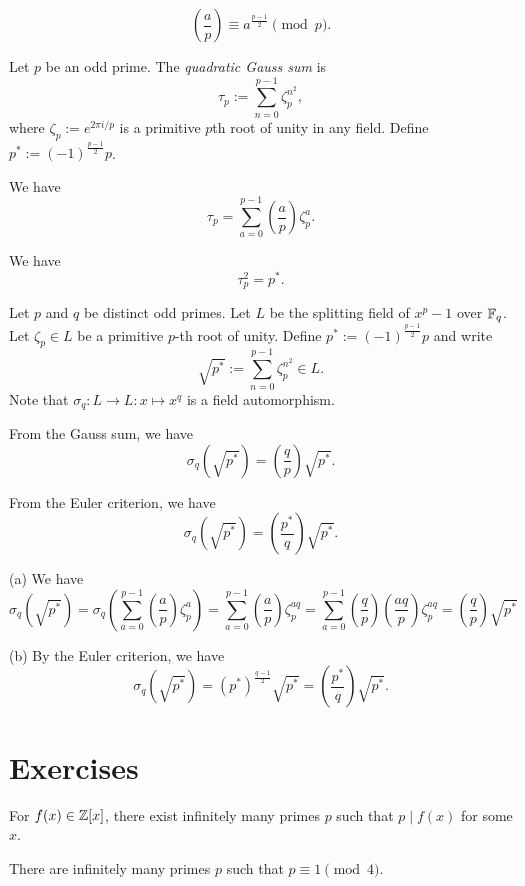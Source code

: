 \documentclass{../../large}
\begin{document}
\begin{prb}
\[\left(\frac ap\right)\equiv a^{\frac{p-1}2}\pmod p.\]
\end{prb}

\begin{prb}
Let $p$ be an odd prime.
The \emph{quadratic Gauss sum} is
\[\tau_p:=\sum_{n=0}^{p-1}\zeta_p^{n^2},\]
where $\zeta_p:=e^{2\pi i/p}$ is a primitive $p$th root of unity in any field.
Define $p^*:=(-1)^{\frac{p-1}2}p$.
\begin{parts}
\item We have
\[\tau_p=\sum_{a=0}^{p-1}\left(\frac ap\right)\zeta_p^a.\]
\item We have
\[\tau_p^2=p^*.\]
\end{parts}
\end{prb}

\begin{prb}
Let $p$ and $q$ be distinct odd primes.
Let $L$ be the splitting field of $x^p-1$ over $\mathbb{F}_q$.
Let $\zeta_p\in L$ be a primitive $p$-th root of unity.
Define $p^*:=(-1)^{\frac{p-1}2}p$ and write
\[\sqrt{p^*}:=\sum_{n=0}^{p-1}\zeta_p^{n^2}\in L.\]
Note that $\sigma_q:L\to L:x\mapsto x^q$ is a field automorphism.
\begin{parts}
\item From the Gauss sum, we have
\[\sigma_q(\sqrt{p^*})=\left(\frac qp\right)\sqrt{p^*}.\]
\item From the Euler criterion, we have
\[\sigma_q(\sqrt{p^*})=\left(\frac{p^*}q\right)\sqrt{p^*}.\]
\end{parts}
\end{prb}
\begin{pf}
(a)
We have
\[\sigma_q(\sqrt{p^*})
=\sigma_q\left(\sum_{a=0}^{p-1}\left(\frac ap\right)\zeta_p^a\right)
=\sum_{a=0}^{p-1}\left(\frac ap\right)\zeta_p^{aq}
=\sum_{a=0}^{p-1}\left(\frac qp\right)\left(\frac{aq}p\right)\zeta_p^{aq}
=\left(\frac qp\right)\sqrt{p^*}\]

(b)
By the Euler criterion, we have
\[\sigma_q(\sqrt{p^*})=(p^*)^{\frac{q-1}2}\sqrt{p^*}=\left(\frac{p^*}q\right)\sqrt{p^*}.\]

\end{pf}



\section*{Exercises}
\begin{prb}
\begin{parts}
\item For $f(x)\in\mathbb{Z}[x]$, there exist infinitely many primes $p$ such that $p\mid f(x)$ for some $x$.
\item There are infinitely many primes $p$ such that $p\equiv1\pmod4$.
\end{parts}
\end{prb}
\end{document}
